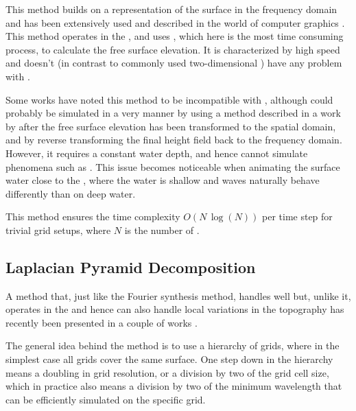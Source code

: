 This method \citep{Mastin1987} builds on  a representation of the surface in the frequency domain and has been extensively used and described in the world of computer graphics \citep{Monnier}. This method operates in the , and uses \FFT, which here is the most time consuming process, to calculate the free surface elevation. It is characterized by high speed and doesn't (in contrast to commonly used two-dimensional \PDEs) have any problem with .

Some works have noted this method to be incompatible with \FSI \citep{Chentanez2011a}, although \FSI could probably be simulated in a very \approximating manner by using a method described in a work by \citet{Ottosson2011} after the free surface elevation has been transformed to the spatial domain, and by reverse transforming the final height field back to the frequency domain. However, it requires a constant water depth, and hence cannot simulate phenomena such as . This issue becomes noticeable when animating the surface water close to the , where the water is shallow and waves naturally behave differently than on deep water.

This method ensures the time complexity $O(N\,\log(N))$ per time step for trivial grid setups, where $N$ is the number of .

\subsection{Laplacian Pyramid Decomposition}
\label{sec:lacplacian_pyramid_decomposition}

A method that, just like the Fourier synthesis method, handles  well but, unlike it, operates in the  and hence can also handle local variations in the topography has recently been presented in a couple of works \citep{Ottosson2011,Lennartsson2012}.

The general idea behind the method is to use a hierarchy of grids, where in the simplest case all grids cover the same surface. One step down in the hierarchy means a doubling in grid resolution, or a division by two of the grid cell size, which in practice also means a division by two of the minimum wavelength that can be efficiently simulated on the specific grid.

